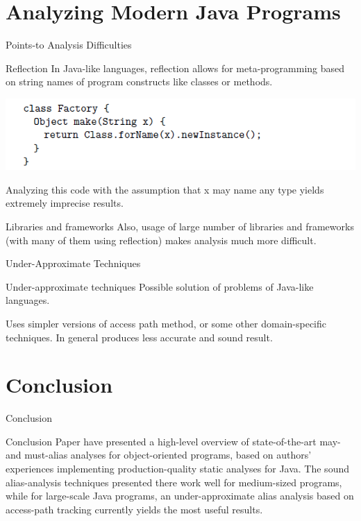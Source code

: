 \documentclass{beamer}
\begin{document}
\section{Analyzing Modern Java Programs}

\begin{frame}{Points-to Analysis Difficulties}
	\begin{block}{Reflection}
		In Java-like languages, reflection allows for meta-programming based on string
		names of program constructs like classes or methods.
	\end{block}	
	\pause
	\includegraphics[width=\paperwidth]{fig8.png}
	\pause
	\begin{block}{}
		Analyzing this code with the assumption that x may name any type yields
		extremely imprecise results.
	\end{block}	
	\pause
	\begin{block}{Libraries and frameworks}
		Also, usage of large number of libraries and frameworks (with many of them using reflection) makes 
		analysis much more difficult.
	\end{block}	
\end{frame}

\begin{frame}{Under-Approximate Techniques}
	\begin{block}{Under-approximate techniques}
		Possible solution of problems of Java-like languages. 
	\end{block}	
	\pause
	\begin{block}{}
		Uses simpler versions of access path method, or some other domain-specific techniques.
		In general produces less accurate and sound result.
	\end{block}	
\end{frame}

\section{Conclusion}

\begin{frame}{Conclusion}
	\begin{block}{Conclusion}
		Paper have presented a high-level overview of state-of-the-art may- and must-alias
		analyses for object-oriented programs, based on authors' experiences implementing
		production-quality static analyses for Java. The sound alias-analysis techniques
		presented there work well for medium-sized programs, while for large-scale Java
		programs, an under-approximate alias analysis based on access-path tracking
		currently yields the most useful results.
	\end{block}	
\end{frame}
\end{document}

